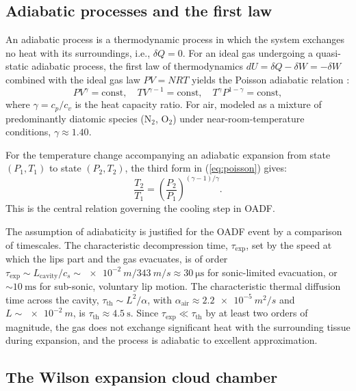 \documentclass[11pt,a4paper]{article}
\theoremstyle{definition}
\theoremstyle{plain}
\begin{document}
\subsection{Adiabatic processes and the first law}
\label{sec:adiabatic}

An adiabatic process is a thermodynamic process in which the system exchanges no heat with its surroundings, i.e., $\delta Q = 0$. For an ideal gas undergoing a quasi-static adiabatic process, the first law of thermodynamics $dU = \delta Q - \delta W = -\delta W$ combined with the ideal gas law $PV = NRT$ yields the Poisson adiabatic relation \citep{Callen1985,Reif1965}:
\begin{equation}
\label{eq:poisson}
PV^\gamma = \text{const}, \quad TV^{\gamma-1} = \text{const}, \quad T^\gamma P^{1-\gamma} = \text{const},
\end{equation}
where $\gamma = c_p/c_v$ is the heat capacity ratio. For air, modeled as a mixture of predominantly diatomic species (N$_2$, O$_2$) under near-room-temperature conditions, $\gamma \approx 1.40$.

For the temperature change accompanying an adiabatic expansion from state $(P_1, T_1)$ to state $(P_2, T_2)$, the third form in (\ref{eq:poisson}) gives:
\begin{equation}
\label{eq:T-ratio}
\frac{T_2}{T_1} = \left(\frac{P_2}{P_1}\right)^{(\gamma-1)/\gamma}.
\end{equation}
This is the central relation governing the cooling step in OADF.

The assumption of adiabaticity is justified for the OADF event by a comparison of timescales. The characteristic decompression time, $\tau_{\text{exp}}$, set by the speed at which the lips part and the gas evacuates, is of order $\tau_{\text{exp}} \sim L_{\text{cavity}}/c_s \sim \SI{e-2}{m}/\SI{343}{m/s} \approx \SI{30}{\micro\second}$ for sonic-limited evacuation, or $\sim\!\SI{10}{\milli\second}$ for sub-sonic, voluntary lip motion. The characteristic thermal diffusion time across the cavity, $\tau_{\text{th}} \sim L^2/\alpha$, with $\alpha_{\text{air}} \approx \SI{2.2e-5}{m^2/s}$ and $L \sim \SI{e-2}{m}$, is $\tau_{\text{th}} \approx \SI{4.5}{\second}$. Since $\tau_{\text{exp}} \ll \tau_{\text{th}}$ by at least two orders of magnitude, the gas does not exchange significant heat with the surrounding tissue during expansion, and the process is adiabatic to excellent approximation.

\subsection{The Wilson expansion cloud chamber}
\label{sec:wilson}
\end{document}
